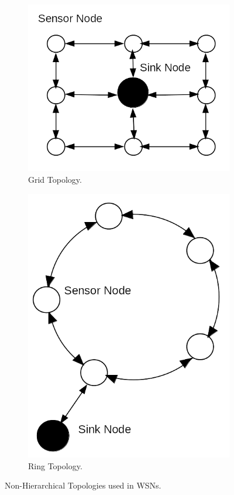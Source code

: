 \documentclass[12pt, oneandhalf, chaparabic, sees, ms]{metu}
\begin{document}
\newpage
% 
%
% 
\begin{figure}[!tbp]
  \begin{subfigure}[b]{0.4\textwidth}
    \includegraphics[width=\textwidth]{grid.png}
    \caption{Grid Topology.}
    \label{fig:grid}
  \end{subfigure}
  \hfill
  \begin{subfigure}[b]{0.4\textwidth}
    \includegraphics[width=\textwidth]{ring.png}
    \caption{Ring Topology.}
    \label{fig:ring}
  \end{subfigure}
  \caption{Non-Hierarchical Topologies used in WSNs.}
\end{figure}
\end{document}
